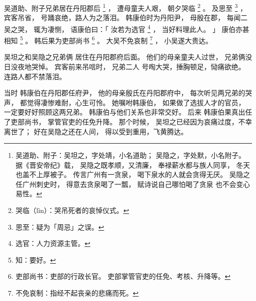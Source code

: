 
\switchcolumn*[\section{}]

吴道助、附子兄弟居在丹阳郡后%
\footnote{%
    吴道助、附子：吴坦之，字处靖，小名道助；
                  吴隐之，字处默，小名附子。
                  据《晋安帝纪》载，
                  吴隐之既孝顺，又清廉，
                  奉䘵薪水都与族人同享，
                  冬天也盖不上厚被子。
                  传言广州有一贪泉，
                  喝下泉水的人就会贪得无厌。
                  吴隐之任广州刺史时，
                  得意去贪泉喝了一瓢，
                  赋诗说自己哪怕喝了贪泉
                  也不会变心易性。
}%
，
遭母童夫人艰，
朝夕哭临%
\footnote{%
    哭临（lìn）：哭吊死者的哀悼仪式。
}%
。
及思至%
\footnote{%
    思至：疑为「周忌」之误。
}%
，
宾客吊省，
号踊哀绝，路人为之落泪。
韩康伯时为丹阳尹，
母殷在郡，
每闻二吴之哭，
辄为凄恻，
语康伯曰：「
    汝若为选官%
    \footnote{%
        选官：人力资源主管。
    }%
    ，
    当好料理此人。
」
康伯亦甚相知%
\footnote{%
    知：要好。
}%
。
韩后果为吏部尚书%
\footnote{%
    吏部尚书：吏部的行政长官。
              吏部掌管官吏的任免、考核、升降等。
}%
。
大吴不免哀制%
\footnote{%
    不免哀制：指经不起丧亲的悲痛而死。
}%
，
小吴遂大贵达。

\switchcolumn

吴坦之和吴隐之兄弟俩
居住在丹阳郡府后面。
他们的母亲童夫人过世，
兄弟俩没日没夜地哭悼。
宾客前来吊唁时，
兄弟二人
号啕大哭，捶胸顿足，恸痛欲绝。
连路人都不禁落泪。

当时
韩康伯在丹阳郡任府尹，
他的母亲殷氏在丹阳郡府中，
每次听见两兄弟的哭声，
都觉得凄惨难耐，心生可怜。
她嘱咐韩康伯，
如果做了选拔人才的官员，
一定要好好照顾这两兄弟。
韩康伯与他们关系也非常交好。
后来
韩康伯果真出任了吏部尚书，
掌管官吏的任免升降。
那个时候，
吴坦之已经因为哀痛过度，不幸离世了；
好在吴隐之还在人间，
得以受到重用，飞黄腾达。
